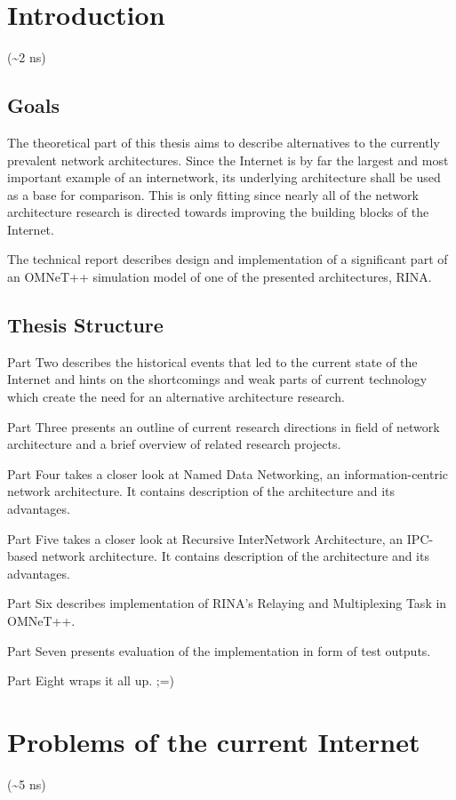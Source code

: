 
\chapter{Introduction}
    (\textasciitilde2 ns)

    \section{Goals}
        The theoretical part of this thesis aims to describe alternatives to the currently prevalent network architectures. Since the Internet is by far the largest and most important example of an internetwork, its underlying architecture shall be used as a base for comparison. This is only fitting since nearly all of the network architecture research is directed towards improving the building blocks of the Internet.

        The technical report describes design and implementation of a significant part of an OMNeT++ simulation model of one of the presented architectures, RINA.

    \section{Thesis Structure}

        Part Two describes the historical events that led to the current state of the Internet and hints on the shortcomings and weak parts of current technology which create the need for an alternative architecture research.

        Part Three presents an outline of current research directions in field of network architecture and a brief overview of related research projects.

        Part Four takes a closer look at Named Data Networking, an information-centric network architecture. It contains description of the architecture and its advantages.

        Part Five takes a closer look at Recursive InterNetwork Architecture, an IPC-based network architecture. It contains description of the architecture and its advantages.

        Part Six describes implementation of RINA's Relaying and Multiplexing Task in OMNeT++.

        Part Seven presents evaluation of the implementation in form of test outputs.

        Part Eight wraps it all up. ;=)

\chapter{Problems of the current Internet}
    (\textasciitilde5 ns)


